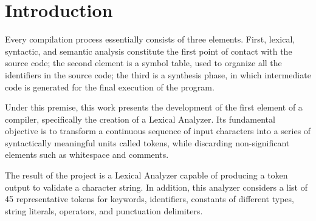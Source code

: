 \documentclass[12pt,letterpaper]{article}
\begin{document}
\newpage
{} %
\tableofcontents
\newpage


\section{Introduction}

Every compilation process essentially consists of three elements. First, lexical, syntactic, and semantic analysis constitute the first point of contact with the source code; the second element is a symbol table, used to organize all the identifiers in the source code; the third is a synthesis phase, in which intermediate code is generated for the final execution of the program.

Under this premise, this work presents the development of the first element of a compiler, specifically the creation of a Lexical Analyzer. Its fundamental objective is to transform a continuous sequence of input characters into a series of syntactically meaningful units called tokens, while discarding non-significant elements such as whitespace and comments.

The result of the project is a Lexical Analyzer capable of producing a token output to validate a character string. In addition, this analyzer considers a list of 45 representative tokens for keywords, identifiers, constants of different types, string literals, operators, and punctuation delimiters.
\end{document}

